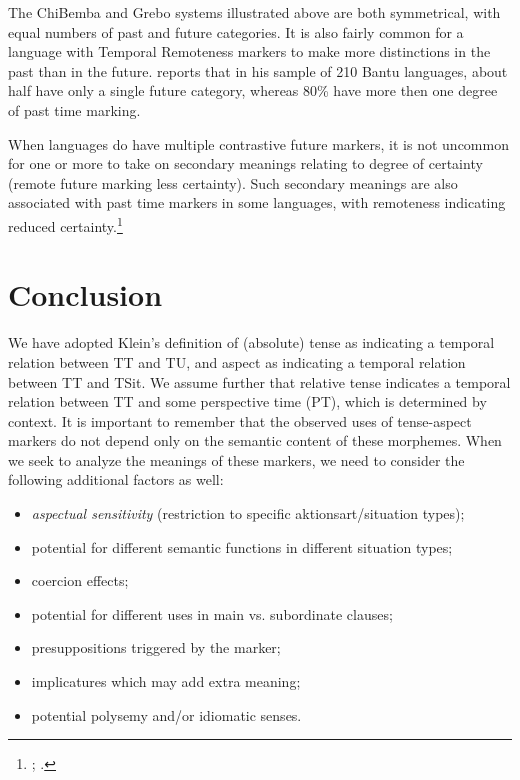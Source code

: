 The ChiBemba and Grebo systems illustrated above are both symmetrical, with equal numbers of past and future categories. It is also fairly common for a language with Temporal Remoteness markers to make more distinctions in the past than in the future. \citet{Nurse2008} reports that in his sample of 210 Bantu languages, about half have only a single future category, whereas 80\% have more then one degree of past time marking. 



When languages do have multiple contrastive future markers, it is not uncommon for one or more to take on secondary meanings relating to degree of certainty (remote future marking less certainty). Such secondary meanings are also associated with past time markers in some languages, with remoteness indicating reduced certainty.\footnote{\citet{Botne2012}; \citet{Nurse2008}.}


\section{Conclusion}\label{sec:21.6}

We have adopted Klein’s definition of (absolute) tense as indicating a temporal relation between TT and TU, and aspect as indicating a temporal relation between TT and TSit. We assume further that relative tense indicates a temporal relation between TT and some perspective time (PT), which is determined by context. It is important to remember that the observed uses of tense-aspect markers do not depend only on the semantic content of these morphemes. When we seek to analyze the meanings of these markers, we need to consider the following additional factors as well:


\begin{itemize}
\item 
\textit{aspectual sensitivity} (restriction to specific aktionsart/situation types);
\item 
potential for different semantic functions in different situation types;
\item 
coercion effects;
\item 
potential for different uses in main vs. subordinate clauses;
\item 
presuppositions triggered by the marker;
\item 
implicatures which may add extra meaning;
\item 
potential polysemy and/or idiomatic senses.
\end{itemize}

